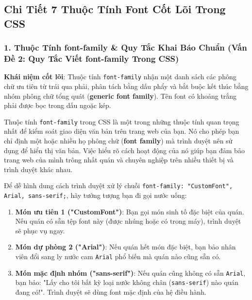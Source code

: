 \documentclass[11pt,oneside]{book}
\newcommand{\codeinline}[1]{\textcolor{accentOrange}{\texttt{#1}}}
\newcommand{\term}[1]{\textbf{\textcolor{primaryBlue}{#1}}}
\begin{document}


\subsection{Chi Tiết 7 Thuộc Tính Font Cốt Lõi Trong CSS}

\subsubsection{1. Thuộc Tính font-family \& Quy Tắc Khai Báo Chuẩn (Vấn Đề 2: Quy Tắc Viết font-family Trong CSS)}

\begin{conceptBox}
\textbf{Khái niệm cốt lõi}: Thuộc tính \codeinline{font-family} nhận một danh sách các phông chữ ưu tiên từ trái qua phải, phân tách bằng dấu phẩy và bắt buộc kết thúc bằng nhóm phông chữ tổng quát (\term{generic font family}). Tên font có khoảng trắng phải được bọc trong dấu ngoặc kép.
\end{conceptBox}

\label{sec:font_family}

Thuộc tính \codeinline{font-family} trong CSS là một trong những thuộc tính quan trọng nhất để kiểm soát giao diện văn bản trên trang web của bạn. Nó cho phép bạn chỉ định một hoặc nhiều họ phông chữ (\term{font family}) mà trình duyệt nên sử dụng để hiển thị văn bản. Việc hiểu rõ cách hoạt động của nó giúp bạn đảm bảo trang web của mình trông nhất quán và chuyên nghiệp trên nhiều thiết bị và trình duyệt khác nhau.


\begin{tipBox}
Để dễ hình dung cách trình duyệt xử lý chuỗi \codeinline{font-family: "CustomFont", Arial, sans-serif;}, hãy tưởng tượng bạn đi gọi nước uống:
\begin{enumerate}[leftmargin=1.5em, itemsep=3pt, parsep=0pt]
    \item \textbf{Món ưu tiên 1 ("CustomFont")}: Bạn gọi món sinh tố đặc biệt của quán. Nếu quán có sẵn tệp font này (được nhúng hoặc có trong máy), trình duyệt sẽ phục vụ ngay.
    \item \textbf{Món dự phòng 2 ("Arial")}: Nếu quán hết món đặc biệt, bạn bảo nhân viên đổi sang ly nước cam \codeinline{Arial} phổ biến mà quán nào cũng sẵn có.
    \item \textbf{Món mặc định nhóm ("sans-serif")}: Nếu quán cũng không có sẵn \codeinline{Arial}, bạn bảo: "Lấy cho tôi bất kỳ loại nước không chân (\codeinline{sans-serif}) nào quán đang có!". Trình duyệt sẽ dùng font mặc định của hệ điều hành.
\end{enumerate}
\end{tipBox}
\end{document}

